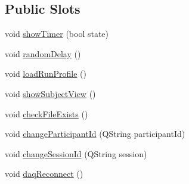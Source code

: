 \subsection*{Public Slots}
\begin{DoxyCompactItemize}
\item 
void \hyperlink{class_perturbation_tab_widget_a2b0878675fa56a11049173a0a8230cfe}{show\+Timer} (bool state)
\item 
void \hyperlink{class_perturbation_tab_widget_a09c65ab9737d61975cebc94fe843482d}{random\+Delay} ()
\item 
void \hyperlink{class_perturbation_tab_widget_aeecb373be32ddc6ea3c165d685b2a386}{load\+Run\+Profile} ()
\item 
void \hyperlink{class_perturbation_tab_widget_a7cfe137c13f1e9c2e98cbd7580c671ec}{show\+Subject\+View} ()
\item 
void \hyperlink{class_perturbation_tab_widget_a2bd4fa89c8315386ed15cd04f9b5ec84}{check\+File\+Exists} ()
\item 
void \hyperlink{class_perturbation_tab_widget_a67b4c15cd26d35da1eb09559e2136502}{change\+Participant\+Id} (Q\+String participant\+Id)
\item 
void \hyperlink{class_perturbation_tab_widget_a9d551ffcaf3d0ebe54015f5536d261ab}{change\+Session\+Id} (Q\+String session)
\item 
void \hyperlink{class_perturbation_tab_widget_a91a2b49c6b8672cd15cce43be89083c2}{daq\+Reconnect} ()
\end{DoxyCompactItemize}
